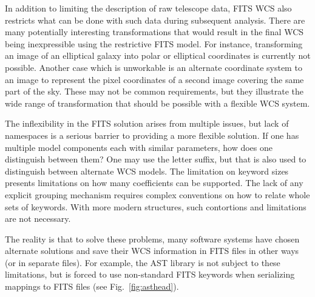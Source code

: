 \documentclass[final,authoryear,5p,times,twocolumn]{elsarticle}
\begin{document}
{{In addition to limiting the description of raw telescope data, FITS
WCS also restricts what can be done with such data during subsequent
analysis. There are many potentially interesting transformations that
would result in the final WCS being inexpressible using the
restrictive FITS model. For instance, transforming an image of an
elliptical galaxy into polar or elliptical coordinates is currently not possible. Another
case which is unworkable is an alternate coordinate system to an image to
represent the pixel coordinates of a second image covering the same
part of the sky.  These may not be common requirements, but they
illustrate the wide range of transformation that should be possible
with a flexible WCS system.


The inflexibility in the FITS solution arises from multiple issues,
but lack of namespaces is a serious barrier to providing a more
flexible solution. If one has multiple model components each with
similar parameters, how does one distinguish between them? One may use
the letter suffix, but that is also used to distinguish between
alternate WCS models. The limitation on keyword sizes presents
limitations on how many coefficients can be supported. The lack of any
explicit grouping mechanism requires complex conventions on how to
relate whole sets of keywords. With more modern structures, such
contortions and limitations are not necessary.


The reality is that to solve these problems, many software systems
have chosen alternate solutions and save their WCS information in FITS
files in other ways (or in separate files). For example, the AST
library \citep{1998ASPC..145...41W,2012ASPC..461..825B} is not subject
to these limitations, but 
is forced to use non-standard FITS keywords when serializing mappings 
to FITS files (see Fig.~\ref{fig:asthead}).


}}
\end{document}
